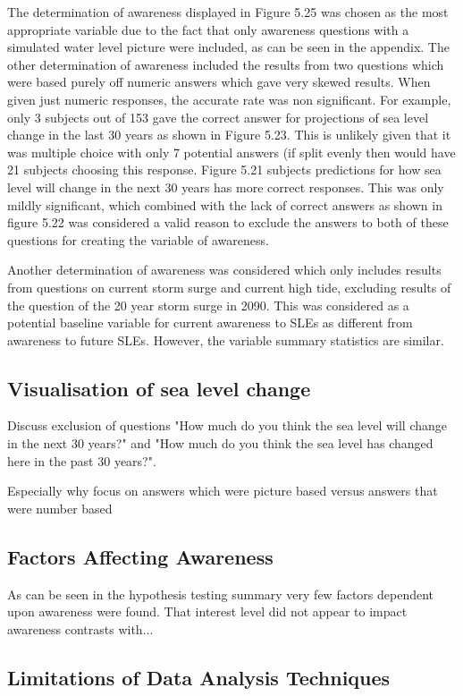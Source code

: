 The determination of awareness displayed in Figure 5.25 was chosen as the most appropriate variable due to the fact that only awareness questions with a simulated water level picture were included, as can be seen in the appendix. The other determination of awareness included the results from two questions which were based purely off numeric answers which gave very skewed results. When given just numeric responses, the accurate rate was non significant. For example, only 3 subjects out of 153 gave the correct answer for projections of sea level change in the last 30 years as shown in Figure 5.23.  This is unlikely given that it was multiple choice with only 7 potential answers (if split evenly then would have 21 subjects choosing this response. Figure 5.21 subjects predictions for how sea level will change in the next 30 years has more correct responses. This was only mildly significant, which combined with the lack of correct answers as shown in figure 5.22 was considered a valid reason to exclude the answers to both of these questions for creating the variable of awareness. 


Another determination of awareness was considered which only includes results from questions on current storm surge and current high tide, excluding results of the question of the 20 year storm surge in 2090. This was considered as a potential baseline variable for current awareness to SLEs as different from awareness to future SLEs. However, the variable summary statistics are similar.

\subsection{Visualisation of sea level change}
Discuss exclusion of questions "How much do you think the sea level will change in the next 30 years?" and "How much do you think the sea level has changed here in the past 30 years?". 

Especially why focus on answers which were picture based versus answers that were number based



\subsection{Factors Affecting Awareness}
As can be seen in the hypothesis testing summary very few factors dependent upon awareness were found. That interest level did not appear to impact awareness contrasts with...

\subsection{Limitations of Data Analysis Techniques }


